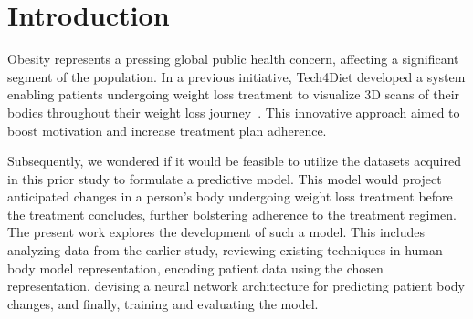 
\chapter{Introduction}

Obesity represents a pressing global public health concern, affecting a
significant segment of the population. In a previous initiative, Tech4Diet
developed a system enabling patients undergoing weight loss treatment to
visualize 3D scans of their bodies throughout their weight loss
journey~\cite{Azorin-Lopez2020}. This innovative approach aimed to boost
motivation and increase treatment plan adherence.

Subsequently, we wondered if it would be feasible to utilize the datasets
acquired in this prior study to formulate a predictive model. This model would
project anticipated changes in a person's body undergoing weight loss treatment
before the treatment concludes, further bolstering adherence to the treatment
regimen. The present work explores the development of such a model. This
includes analyzing data from the earlier study, reviewing existing techniques
in human body model representation, encoding patient data using the chosen
representation, devising a neural network architecture for predicting patient
body changes, and finally, training and evaluating the model.